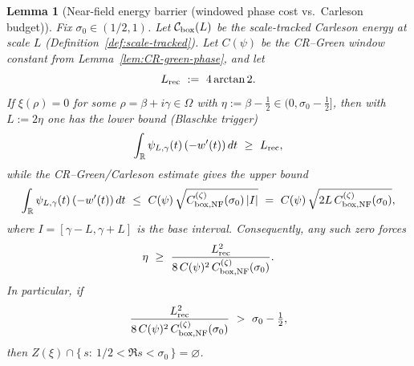 \documentclass[11pt]{article}
\newtheorem{lemma}[theorem]{Lemma}
\theoremstyle{definition}
\theoremstyle{remark}
\theoremstyle{definition}
\newcommand{\R}{\mathbb{R}}
\begin{document}
\begin{lemma}[Near-field energy barrier (windowed phase cost vs.\ Carleson budget)]\label{lem:energy-barrier}
Fix $\sigma_0\in(1/2,1)$. Let $\mathcal{C}_{\rm box}(L)$ be the scale-tracked Carleson energy at scale $L$ (Definition~\ref{def:scale-tracked}).
Let $C(\psi)$ be the CR--Green window constant from Lemma~\ref{lem:CR-green-phase}, and let
\[
  L_{\rm rec}\ :=\ 4\arctan 2.
\]
If $\xi(\rho)=0$ for some $\rho=\beta+i\gamma\in\Omega$ with $\eta:=\beta-\tfrac12\in(0,\sigma_0-\tfrac12]$, then with $L:=2\eta$ one has the lower bound (Blaschke trigger)
\begin{equation}\label{eq:bl-trigger}
  \int_{\R} \psi_{L,\gamma}(t)\,(-w'(t))\,dt\ \ge\ L_{\rm rec},
\end{equation}
while the CR--Green/Carleson estimate gives the upper bound
\begin{equation}\label{eq:energy-budget-window}
  \int_{\R} \psi_{L,\gamma}(t)\,(-w'(t))\,dt
  \ \le\ C(\psi)\,\sqrt{C_{{\rm box},{\rm NF}}^{(\zeta)}(\sigma_0)\,|I|}\ =\ C(\psi)\,\sqrt{2L\,C_{{\rm box},{\rm NF}}^{(\zeta)}(\sigma_0)},
\end{equation}
where $I=[\gamma-L,\gamma+L]$ is the base interval.
Consequently, any such zero forces
\[
  \eta\ \ge\ \frac{L_{\rm rec}^2}{8\,C(\psi)^2\,C_{{\rm box},{\rm NF}}^{(\zeta)}(\sigma_0)}.
\]
In particular, if
\[
  \frac{L_{\rm rec}^2}{8\,C(\psi)^2\,C_{{\rm box},{\rm NF}}^{(\zeta)}(\sigma_0)}\ >\ \sigma_0-\tfrac12,
\]
then
$Z(\xi)\cap\{\,s:\ 1/2<\Re s<\sigma_0\,\}=\varnothing$.
\end{lemma}
\end{document}
